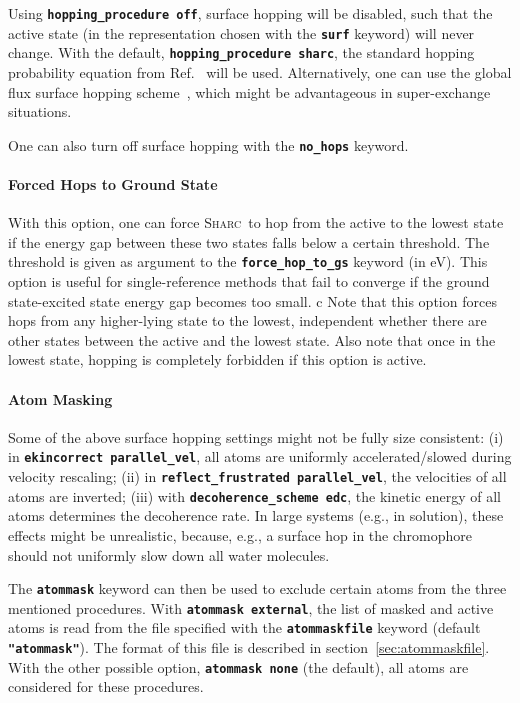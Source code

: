 \documentclass[a4paper,10pt,DIV=15,openany]{scrbook}
\newcommand{\sharc}{\textsc{Sharc}}
\newcommand{\ttt}[1]{\textbf{\texttt{#1}}}
\begin{document}
Using \ttt{hopping\_procedure off}, surface hopping will be disabled, such that the active state (in the representation chosen with the \ttt{surf} keyword) will never change.
With the default, \ttt{hopping\_procedure sharc}, the standard hopping probability equation from Ref.~\cite{Mai2015IJQC} will be used.
Alternatively, one can use the global flux surface hopping scheme~\cite{Wang2014JCTC}, which might be advantageous in super-exchange situations.

One can also turn off surface hopping with the \ttt{no\_hops} keyword.

\paragraph{Forced Hops to Ground State}

With this option, one can force \sharc\ to hop from the active to the lowest state if the energy gap between these two states falls below a certain threshold. 
The threshold is given as argument to the \ttt{force\_hop\_to\_gs} keyword (in eV).
This option is useful for single-reference methods that fail to converge if the ground state-excited state energy gap becomes too small.
c
Note that this option forces hops from any higher-lying state to the lowest, independent whether there are other states between the active and the lowest state.
Also note that once in the lowest state, hopping is completely forbidden if this option is active.

\paragraph{Atom Masking}

Some of the above surface hopping settings might not be fully size consistent: (i) in \ttt{ekincorrect parallel\_vel}, all atoms are uniformly accelerated/slowed during velocity rescaling; (ii) in \ttt{reflect\_frustrated parallel\_vel}, the velocities of all atoms are inverted; (iii) with \ttt{decoherence\_scheme edc}, the kinetic energy of all atoms determines the decoherence rate. In large systems (e.g., in solution), these effects might be unrealistic, because, e.g., a surface hop in the chromophore should not uniformly slow down all water molecules.

The \ttt{atommask} keyword can then be used to exclude certain atoms from the three mentioned procedures. With \ttt{atommask external}, the list of masked and active atoms is read from the file specified with the \ttt{atommaskfile} keyword (default \ttt{"atommask"}). The format of this file is described in section~\ref{sec:atommaskfile}. With the other possible option, \ttt{atommask none} (the default), all atoms are considered for these procedures.
\end{document}
